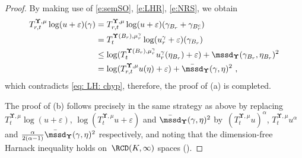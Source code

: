 \documentclass[11pt,letterpaper]{amsart}
\newcommand{\N}{{\mathbb N}}
\newcommand{\comma}{\,\,\mathrm{,}\;\,}
\newcommand{\fstop}{\,\,\mathrm{.}}
\newcommand{\QP}{{\mu}}
\newcommand{\e}{\varepsilon}
\newcommand{\dUpsilon}{{\mathbf \Upsilon}}
\newcommand{\U}{\dUpsilon}
\renewcommand{\1}{\mathbf 1}
\numberwithin{equation}{section}
\theoremstyle{plain}
\theoremstyle{definition}
\theoremstyle{remark}
\begin{document}
\begin{proof}
By making use of \eqref{e:semSO}, \eqref{e:LHR}, \eqref{e:NRS}, we obtain %
\begin{align} \label{eq: LH:3}
 T^{\U, \QP}_{r, t}\log (u+\e)(\gamma)  
 & =  T^{\U, \QP}_{r, t}\log (u+\e)(\gamma_{B_r} + \gamma_{B_r^c} )  
 \\
 &= T^{\U(B_r), \QP_r^{\gamma}}_t\log (u_r^{\gamma}+\e)(\gamma_{B_r})  \notag
 \\
 & \le \log (T^{\U(B_r), \QP_r^{\gamma}}_tu_r^\gamma(\eta_{B_r})+\e) + \mssd_\U(\gamma_{B_r}, \eta_{B_r})^2 \notag
 \\
  &=\log (T^{\U, \QP}_{r, t}u(\eta) +\e)+ \bar{\mssd}_\U(\gamma, \eta)^2 \notag \comma
\end{align}
which contradicts \eqref{eq: LH: chyp}, therefore, the proof of (a) is completed. 

The proof of (b) follows precisely in the same strategy as above by replacing $T^{\U, \QP}_{t}\log (u+\e)$,  $\log (T^{\U, \QP}_{t}u+\e)$ and $\bar{\mssd}_\U(\gamma, \eta)^2$ by~$(T^{\U, \QP}_tu)^\alpha$, $T^{\U, \QP}_tu^\alpha$ and $\frac{\alpha}{2(\alpha-1)}\bar{\mssd}_\U(\gamma, \eta)^2$ respectively, and noting that the dimension-free Harnack inequality holds on~$\RCD(K,\infty)$ spaces (\cite[Thm.~3.1]{Li15}).


\end{proof}
\end{document}
